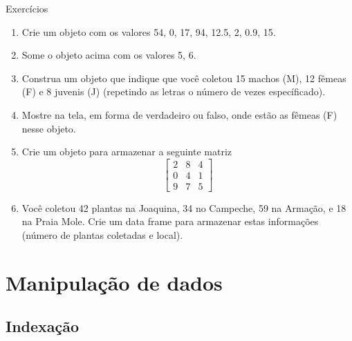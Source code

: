 \documentclass[10pt,handout]{beamer}\usepackage{graphicx, color}
\begin{document}
\begin{frame}[fragile=singleslide]{Exercícios}
  \begin{enumerate}
  \item Crie um objeto com os valores 54, 0, 17, 94, 12.5, 2, 0.9, 15.
  \item Some o objeto acima com os valores 5, 6.
  \item Construa um objeto que indique que você coletou 15 machos (M),
    12 fêmeas (F) e 8 juvenis (J) (repetindo as letras o número de vezes
    específicado).
  \item Mostre na tela, em forma de verdadeiro ou falso, onde estão as
    fêmeas (F) nesse objeto.
  \item Crie um objeto para armazenar a seguinte matriz
    \[ \left[ \begin{array}{ccc}
        2 & 8 & 4 \\
        0 & 4 & 1 \\
        9 & 7 & 5
      \end{array} \right] \]
  \item Você coletou 42 plantas na Joaquina, 34 no Campeche, 59 na
    Armação, e 18 na Praia Mole. Crie um data frame para armazenar estas
    informações (número de plantas coletadas e local).
  \end{enumerate}
\end{frame}

\section{Manipulação de dados}

\subsection{Indexação}
\end{document}
